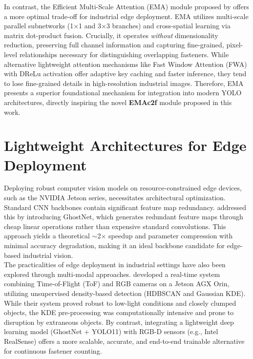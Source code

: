 In contrast, the Efficient Multi-Scale Attention (EMA) module proposed by \cite{Ouyang_2023} offers a more optimal trade-off for industrial edge deployment. EMA utilizes multi-scale parallel subnetworks (1$\times$1 and 3$\times$3 branches) and cross-spatial learning via matrix dot-product fusion. Crucially, it operates \textit{without} dimensionality reduction, preserving full channel information and capturing fine-grained, pixel-level relationships necessary for distinguishing overlapping fasteners. While alternative lightweight attention mechanisms like Fast Window Attention (FWA) with DReLu activation \cite{li2025lightweightbackbonenetworksrequire} offer adaptive key caching and faster inference, they tend to lose fine-grained details in high-resolution industrial images. Therefore, EMA presents a superior foundational mechanism for integration into modern YOLO architectures, directly inspiring the novel \textbf{EMAc2f} module proposed in this work.

\section{Lightweight Architectures for Edge Deployment}
Deploying robust computer vision models on resource-constrained edge devices, such as the NVIDIA Jetson series, necessitates architectural optimization. Standard CNN backbones contain significant feature map redundancy. \cite{han2020ghostnetfeaturescheapoperations} addressed this by introducing GhostNet, which generates redundant feature maps through cheap linear operations rather than expensive standard convolutions. This approach yields a theoretical $\sim$2$\times$ speedup and parameter compression with minimal accuracy degradation, making it an ideal backbone candidate for edge-based industrial vision.\\

The practicalities of edge deployment in industrial settings have also been explored through multi-modal approaches. \cite{lim2025realtimemultimodalobjectdetection} developed a real-time system combining Time-of-Flight (ToF) and RGB cameras on a Jetson AGX Orin, utilizing unsupervised density-based detection (HDBSCAN and Gaussian KDE). While their system proved robust to low-light conditions and closely clumped objects, the KDE pre-processing was computationally intensive and prone to disruption by extraneous objects. By contrast, integrating a lightweight deep learning model (GhostNet + YOLO11) with RGB-D sensors (e.g., Intel RealSense) offers a more scalable, accurate, and end-to-end trainable alternative for continuous fastener counting.

